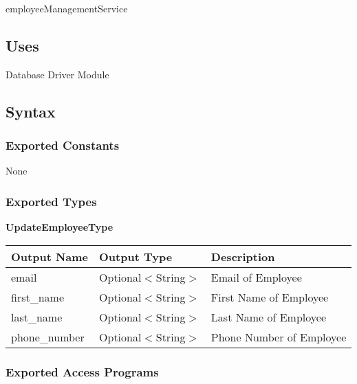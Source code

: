 \documentclass[12pt, titlepage]{article}
\begin{document}
employeeManagementService

\subsection{Uses}

Database Driver Module

\subsection{Syntax}

\subsubsection{Exported Constants}

None

\subsubsection{Exported Types}

\textbf{UpdateEmployeeType}

\begin{table}[H]
	\begin{tabular}{|p{}|p{}|p{}|}
		\hline
		\textbf{Output Name} & \textbf{Output Type} & \textbf{Description}     \\
		\hline
		email                & Optional$<$String$>$ & Email of Employee        \\
		\hline
		first\_name          & Optional$<$String$>$ & First Name of Employee   \\
		\hline
		last\_name           & Optional$<$String$>$ & Last Name of Employee    \\
		\hline
		phone\_number        & Optional$<$String$>$ & Phone Number of Employee \\
		\hline
	\end{tabular}
\end{table}

\subsubsection{Exported Access Programs}
\end{document}
